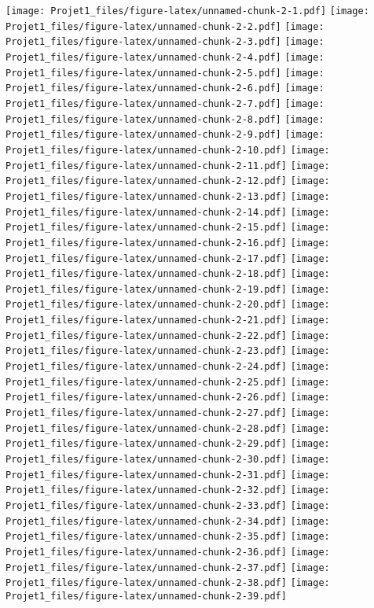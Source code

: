 \documentclass[
]{article}
\begin{document}
\texttt{[image: Projet1\_files/figure-latex/unnamed-chunk-2-1.pdf]}
\texttt{[image: Projet1\_files/figure-latex/unnamed-chunk-2-2.pdf]}
\texttt{[image: Projet1\_files/figure-latex/unnamed-chunk-2-3.pdf]}
\texttt{[image: Projet1\_files/figure-latex/unnamed-chunk-2-4.pdf]}
\texttt{[image: Projet1\_files/figure-latex/unnamed-chunk-2-5.pdf]}
\texttt{[image: Projet1\_files/figure-latex/unnamed-chunk-2-6.pdf]}
\texttt{[image: Projet1\_files/figure-latex/unnamed-chunk-2-7.pdf]}
\texttt{[image: Projet1\_files/figure-latex/unnamed-chunk-2-8.pdf]}
\texttt{[image: Projet1\_files/figure-latex/unnamed-chunk-2-9.pdf]}
\texttt{[image: Projet1\_files/figure-latex/unnamed-chunk-2-10.pdf]}
\texttt{[image: Projet1\_files/figure-latex/unnamed-chunk-2-11.pdf]}
\texttt{[image: Projet1\_files/figure-latex/unnamed-chunk-2-12.pdf]}
\texttt{[image: Projet1\_files/figure-latex/unnamed-chunk-2-13.pdf]}
\texttt{[image: Projet1\_files/figure-latex/unnamed-chunk-2-14.pdf]}
\texttt{[image: Projet1\_files/figure-latex/unnamed-chunk-2-15.pdf]}
\texttt{[image: Projet1\_files/figure-latex/unnamed-chunk-2-16.pdf]}
\texttt{[image: Projet1\_files/figure-latex/unnamed-chunk-2-17.pdf]}
\texttt{[image: Projet1\_files/figure-latex/unnamed-chunk-2-18.pdf]}
\texttt{[image: Projet1\_files/figure-latex/unnamed-chunk-2-19.pdf]}
\texttt{[image: Projet1\_files/figure-latex/unnamed-chunk-2-20.pdf]}
\texttt{[image: Projet1\_files/figure-latex/unnamed-chunk-2-21.pdf]}
\texttt{[image: Projet1\_files/figure-latex/unnamed-chunk-2-22.pdf]}
\texttt{[image: Projet1\_files/figure-latex/unnamed-chunk-2-23.pdf]}
\texttt{[image: Projet1\_files/figure-latex/unnamed-chunk-2-24.pdf]}
\texttt{[image: Projet1\_files/figure-latex/unnamed-chunk-2-25.pdf]}
\texttt{[image: Projet1\_files/figure-latex/unnamed-chunk-2-26.pdf]}
\texttt{[image: Projet1\_files/figure-latex/unnamed-chunk-2-27.pdf]}
\texttt{[image: Projet1\_files/figure-latex/unnamed-chunk-2-28.pdf]}
\texttt{[image: Projet1\_files/figure-latex/unnamed-chunk-2-29.pdf]}
\texttt{[image: Projet1\_files/figure-latex/unnamed-chunk-2-30.pdf]}
\texttt{[image: Projet1\_files/figure-latex/unnamed-chunk-2-31.pdf]}
\texttt{[image: Projet1\_files/figure-latex/unnamed-chunk-2-32.pdf]}
\texttt{[image: Projet1\_files/figure-latex/unnamed-chunk-2-33.pdf]}
\texttt{[image: Projet1\_files/figure-latex/unnamed-chunk-2-34.pdf]}
\texttt{[image: Projet1\_files/figure-latex/unnamed-chunk-2-35.pdf]}
\texttt{[image: Projet1\_files/figure-latex/unnamed-chunk-2-36.pdf]}
\texttt{[image: Projet1\_files/figure-latex/unnamed-chunk-2-37.pdf]}
\texttt{[image: Projet1\_files/figure-latex/unnamed-chunk-2-38.pdf]}
\texttt{[image: Projet1\_files/figure-latex/unnamed-chunk-2-39.pdf]}
\end{document}
